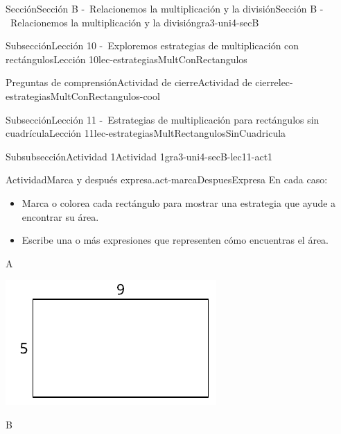 \begin{sectionptx}{Sección}{Sección B -~Relacionemos la multiplicación y la división}{}{Sección B -~Relacionemos la multiplicación y la división}{}{}{gra3-uni4-secB}
\begin{subsectionptx}{Subsección}{Lección 10 -~Exploremos estrategias de multiplicación con rectángulos}{}{Lección 10}{}{}{lec-estrategiasMultConRectangulos}
\begin{reading-questions-subsubsection}{Preguntas de comprensión}{Actividad de cierre}{}{Actividad de cierre}{}{}{lec-estrategiasMultConRectangulos-cool}
\end{reading-questions-subsubsection}
\end{subsectionptx}
%
%
\typeout{************************************************}
\typeout{************************************************}
%
\begin{subsectionptx}{Subsección}{Lección 11 -~Estrategias de multiplicación para rectángulos sin cuadrícula}{}{Lección 11}{}{}{lec-estrategiasMultRectangulosSinCuadricula}
%
%
\typeout{************************************************}
\typeout{************************************************}
%
\begin{subsubsectionptx}{Subsubsección}{Actividad 1}{}{Actividad 1}{}{}{gra3-uni4-secB-lec11-act1}
\begin{activity}{Actividad}{Marca y después expresa.}{act-marcaDespuesExpresa}%
En cada caso:%
%
\begin{itemize}[label=\textbullet]
\item{}Marca o colorea cada rectángulo para mostrar una estrategia que ayude a encontrar su área.%
\item{}Escribe una o más expresiones que representen cómo encuentras el área.%
\end{itemize}
\begin{sidebyside}{3}{0}{0}{0}%
\begin{sbspanel}{0.391}%
A%
\par
\includegraphics[max width=\linewidth, center]{external/svg-source/tikz-file-153084.pdf}
\end{sbspanel}%
\begin{sbspanel}{0.261}%
B%
\par

\end{sbspanel}
\end{sidebyside}
\end{activity}
\end{subsubsectionptx}
\end{subsectionptx}
\end{sectionptx}
